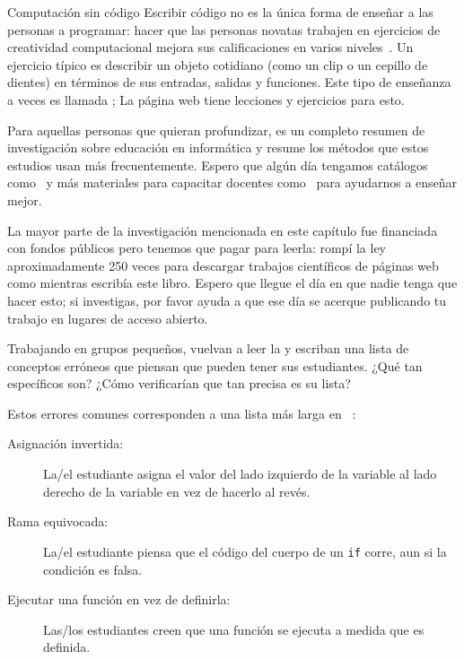 \begin{aside}{Computación sin código}
  Escribir código no es la única forma de enseñar a las personas a programar:
  hacer que las personas novatas trabajen en ejercicios de creatividad computacional mejora sus calificaciones en varios niveles~\cite{Shel2017}.
  Un ejercicio típico es describir un objeto cotidiano (como un clip o un cepillo de dientes)
  en términos de sus entradas, salidas y funciones.
  Este tipo de enseñanza a veces es llamada ;
  La página web  tiene lecciones y ejercicios para esto.
\end{aside}


Para aquellas personas que quieran profundizar,
\cite{Finc2019} es un completo resumen de investigación sobre educación en informática y
\cite{Ihan2016} resume los métodos que estos estudios usan más frecuentemente.
Espero que algún día tengamos catálogos como~\cite{Ojos2015}
y más materiales para capacitar docentes como~\cite{Hazz2014,Guzd2015a,Sent2018}
para ayudarnos a enseñar mejor.

La mayor parte de la investigación mencionada en este capítulo fue financiada con fondos públicos
pero tenemos que pagar para leerla:
rompí la ley aproximadamente 250 veces
para descargar trabajos científicos de páginas web como 
mientras escribía este libro.
Espero que llegue el día en que nadie tenga que hacer esto;
si investigas,
por favor ayuda a que ese día se acerque publicando tu trabajo en lugares de acceso abierto.



Trabajando en grupos pequeños,
vuelvan a leer la  y escriban una lista de conceptos erróneos que piensan que pueden tener sus estudiantes.
¿Qué tan específicos son?
¿Cómo verificarían que tan precisa es su lista?


Estos errores comunes corresponden a una lista más larga en ~\cite{Sirk2012}:

\begin{description}

\item[Asignación invertida:]
  La/el estudiante asigna el valor del lado izquierdo de la variable al lado derecho de la variable
  en vez de hacerlo al revés.

\item[Rama equivocada:]
  La/el estudiante piensa que el código del cuerpo de un \texttt{if} corre,
  aun si la condición es falsa.

\item[Ejecutar una función en vez de definirla:]
  Las/los estudiantes creen que una función se ejecuta a medida que es definida.

\end{description}

